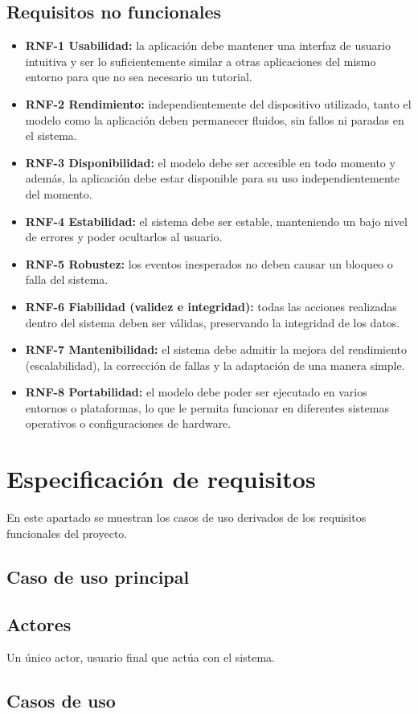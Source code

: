 \subsection{Requisitos no funcionales}

\begin{itemize}
    \item \textbf{RNF-1 Usabilidad:} la aplicación debe mantener una interfaz de usuario intuitiva y ser lo suficientemente similar a otras aplicaciones del mismo entorno para que no sea necesario un tutorial.
    \item \textbf{RNF-2 Rendimiento:} independientemente del dispositivo utilizado, tanto el modelo como la aplicación deben permanecer fluidos, sin fallos ni paradas en el sistema.
    \item \textbf{RNF-3 Disponibilidad:} el modelo debe ser accesible en todo momento y además, la aplicación debe estar disponible para su uso independientemente del momento.
    \item \textbf{RNF-4 Estabilidad:} el sistema debe ser estable, manteniendo un bajo nivel de errores y poder ocultarlos al usuario.
    \item \textbf{RNF-5 Robustez:} los eventos inesperados no deben causar un bloqueo o falla del sistema.
    \item \textbf{RNF-6 Fiabilidad (validez e integridad):} todas las acciones realizadas dentro del sistema deben ser válidas, preservando la integridad de los datos.
    \item \textbf{RNF-7 Mantenibilidad:} el sistema debe admitir la mejora del rendimiento (escalabilidad), la corrección de fallas y la adaptación de una manera simple.
    \item \textbf{RNF-8 Portabilidad:} el modelo debe poder ser ejecutado en varios entornos o plataformas, lo que le permita funcionar en diferentes sistemas operativos o configuraciones de hardware.
\end{itemize}



\section{Especificación de requisitos}

En este apartado se muestran los casos de uso derivados de los requisitos funcionales del proyecto.

\subsection{Caso de uso principal}


\subsection{Actores}

Un único actor, usuario final que actúa con el sistema.

\subsection{Casos de uso}

